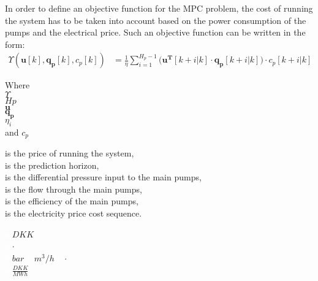 In order to define an objective function for the MPC problem, the cost of running the system has to be taken into account based on the power consumption of the pumps and the electrical price. Such an objective function can be written in the form: 
%
\begin{align}
 \Upsilon(\bm{u}[k],\bm{q_p}[k],c_p[k]) &= \frac{1}{\eta} \sum_{i=1}^{H_p-1} \Big( \bm{u^T}[k+i|k] \cdot  \bm{q_{p}}[k+i|k]\Big)\cdot c_p[k+i|k] \label{eqcost} 
\end{align}
%
%
\begin{minipage}[t]{0.20\textwidth}
Where\\
\hspace*{8mm} $\Upsilon$ \\
\hspace*{8mm} $Hp$ \\
\hspace*{8mm} $\bm{u}$ \\
\hspace*{8mm} $\bm{q_p}$ \\
\hspace*{8mm} $\eta_i$ \\
and \hspace*{0.7mm} $c_p$ 
\end{minipage}
\begin{minipage}[t]{0.68\textwidth}
\vspace*{2mm}
is the price of running the system, \\
is the prediction horizon, \\
is the differential pressure input to the main pumps,\\
is the flow through the main pumps,\\
is the efficiency of the main pumps,\\
is the electricity price cost sequence.
\end{minipage}
\begin{minipage}[t]{0.10\textwidth}
\vspace*{2mm}
\textcolor{White}{te}$\unit{DKK}$\\
\textcolor{White}{te}$\unit{\cdot}$\\
\textcolor{White}{te}$\unit{bar}$
\textcolor{White}{te}$\unit{m^3/h}$
 \textcolor{White}{te}$\unit{\cdot}$\\
\textcolor{White}{te}$\unit{\frac{DKK}{MWh}}$
\end{minipage}

